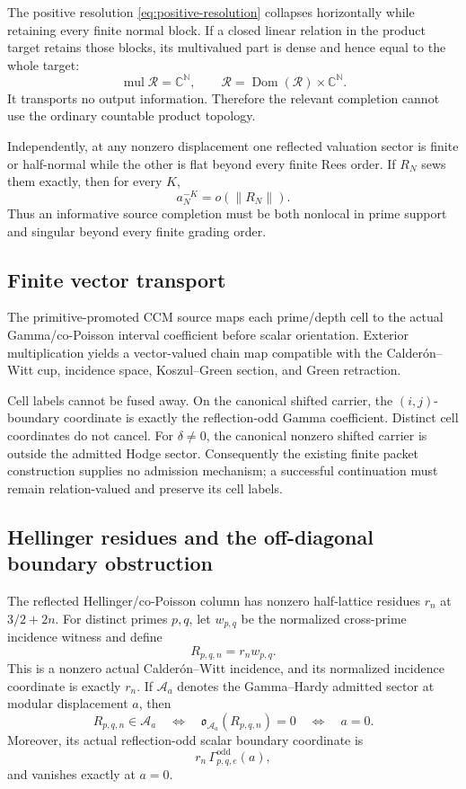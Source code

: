\documentclass[11pt]{article}
\theoremstyle{definition}
\theoremstyle{remark}
\newcommand{\C}{\mathbb C}
\newcommand{\N}{\mathbb N}
\newcommand{\cA}{\mathcal A}
\newcommand{\cR}{\mathcal R}
\newcommand{\Dom}{\operatorname{Dom}}
\begin{document}
The positive resolution \eqref{eq:positive-resolution} collapses
horizontally while retaining every finite normal block.  If a closed
linear relation in the product target retains those blocks, its
multivalued part is dense and hence equal to the whole target:
\[
 \operatorname{mul}\cR=\C^\N,\qquad
 \cR=\Dom(\cR)\times\C^\N.
\tag{4.1}\label{eq:maximal-vertical}
\]
It transports no output information.  Therefore the relevant completion
cannot use the ordinary countable product topology.

Independently, at any nonzero displacement one reflected valuation sector
is finite or half-normal while the other is flat beyond every finite
Rees order.  If \(R_N\) sews them exactly, then for every \(K\),
\[
 a_N^{-K}=o(\|R_N\|).
\tag{4.2}\label{eq:beyond-rees}
\]
Thus an informative source completion must be both nonlocal in prime
support and singular beyond every finite grading order.

\subsection{Finite vector transport}

The primitive-promoted CCM source maps each prime/depth cell to the actual
Gamma/co-Poisson interval coefficient before scalar orientation.  Exterior
multiplication yields a vector-valued chain map compatible with the
Calder\'on--Witt cup, incidence space, Koszul--Green section, and Green
retraction.

Cell labels cannot be fused away.  On the canonical shifted carrier, the
\((i,j)\)-boundary coordinate is exactly the reflection-odd Gamma
coefficient.  Distinct cell coordinates do not cancel.  For
\(\delta\ne0\), the canonical nonzero shifted carrier is outside the
admitted Hodge sector.  Consequently the existing finite packet
construction supplies no admission mechanism; a successful continuation
must remain relation-valued and preserve its cell labels.

\subsection{Hellinger residues and the off-diagonal boundary obstruction}

The reflected Hellinger/co-Poisson column has nonzero half-lattice
residues \(r_n\) at \(3/2+2n\).  For distinct primes \(p,q\), let
\(w_{p,q}\) be the normalized cross-prime incidence witness and define
\[
                         R_{p,q,n}=r_n w_{p,q}.
\tag{4.3}\label{eq:hellinger-incidence-residue}
\]
This is a nonzero actual Calder\'on--Witt incidence, and its normalized
incidence coordinate is exactly \(r_n\).  If \(\cA_a\) denotes the
Gamma--Hardy admitted sector at modular displacement \(a\), then
\[
 R_{p,q,n}\in\cA_a
 \quad\Longleftrightarrow\quad
 \mathfrak o_{\cA_a}(R_{p,q,n})=0
 \quad\Longleftrightarrow\quad a=0.
\tag{4.4}\label{eq:hellinger-relative-class}
\]
Moreover, its actual reflection-odd scalar boundary coordinate is
\[
 r_n\,\Gamma^{\mathrm{odd}}_{p,q,e}(a),
\tag{4.5}\label{eq:hellinger-odd-coordinate}
\]
and vanishes exactly at \(a=0\).
\end{document}

